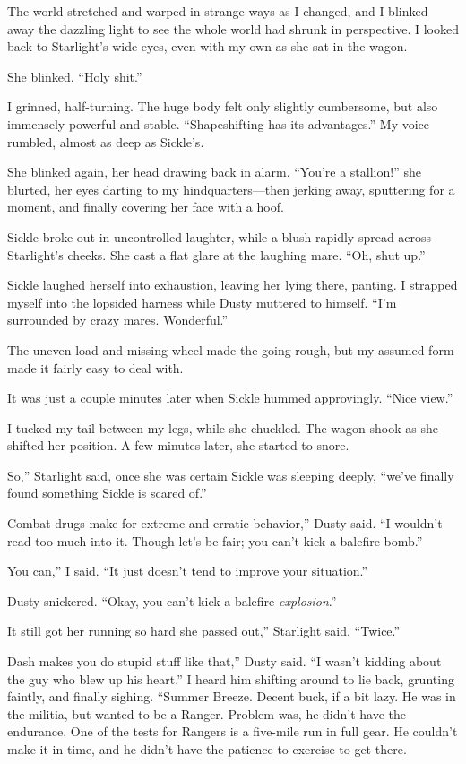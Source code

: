 The world stretched and warped in strange ways as I changed, and I blinked away the dazzling light to see the whole world had shrunk in perspective. I looked back to Starlight’s wide eyes, even with my own as she sat in the wagon.

She blinked. “Holy shit.”

I grinned, half-turning. The huge body felt only slightly cumbersome, but also immensely powerful and stable. “Shapeshifting has its advantages.” My voice rumbled, almost as deep as Sickle’s.

She blinked again, her head drawing back in alarm. “You’re a stallion!” she blurted, her eyes darting to my hindquarters—then jerking away, sputtering for a moment, and finally covering her face with a hoof.

Sickle broke out in uncontrolled laughter, while a blush rapidly spread across Starlight’s cheeks. She cast a flat glare at the laughing mare. “Oh, shut up.”

Sickle laughed herself into exhaustion, leaving her lying there, panting. I strapped myself into the lopsided harness while Dusty muttered to himself. “I’m surrounded by crazy mares. Wonderful.”

The uneven load and missing wheel made the going rough, but my assumed form made it fairly easy to deal with.

It was just a couple minutes later when Sickle hummed approvingly. “Nice view.”

I tucked my tail between my legs, while she chuckled. The wagon shook as she shifted her position. A few minutes later, she started to snore.

\leavevmode{}So,” Starlight said, once she was certain Sickle was sleeping deeply, “we’ve finally found something Sickle is scared of.”

\leavevmode{}Combat drugs make for extreme and erratic behavior,” Dusty said. “I wouldn’t read too much into it. Though let’s be fair; you can’t kick a balefire bomb.”

\leavevmode{}You can,” I said. “It just doesn’t tend to improve your situation.”

Dusty snickered. “Okay, you can’t kick a balefire \textit{explosion}.”

\leavevmode{}It still got her running so hard she passed out,” Starlight said. “Twice.”

\leavevmode{}Dash makes you do stupid stuff like that,” Dusty said. “I wasn’t kidding about the guy who blew up his heart.” I heard him shifting around to lie back, grunting faintly, and finally sighing. “Summer Breeze. Decent buck, if a bit lazy. He was in the militia, but wanted to be a Ranger. Problem was, he didn’t have the endurance. One of the tests for Rangers is a five-mile run in full gear. He couldn’t make it in time, and he didn’t have the patience to exercise to get there.

